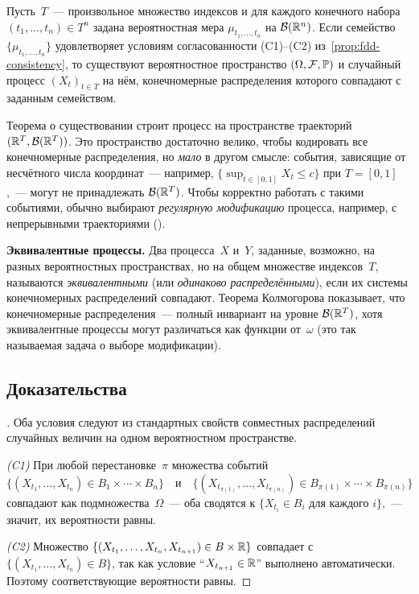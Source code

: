 \begin{theorem}
\label{thm:kolmogorov-extension}
Пусть~$T$~--- произвольное множество индексов и для каждого конечного набора $(t_1, \dots, t_n) \in T^n$ задана вероятностная мера $\mu_{t_1, \dots, t_n}$ на $\mathcal{B}(\mathbb{R}^n)$. Если семейство $\{\mu_{t_1, \dots, t_n}\}$ удовлетворяет условиям согласованности (C1)--(C2) из~\cref{prop:fdd-consistency}, то существуют вероятностное пространство $(\Omega, \mathcal{F}, \mathbb{P})$ и случайный процесс $(X_t)_{t \in T}$ на нём, конечномерные распределения которого совпадают с заданным семейством.
\end{theorem}

\begin{remark}
Теорема о существовании строит процесс на пространстве траекторий $(\mathbb{R}^T, \mathcal{B}(\mathbb{R}^T))$. Это пространство достаточно велико, чтобы кодировать все конечномерные распределения, но \emph{мало} в другом смысле: события, зависящие от несчётного числа координат~--- например, $\{\sup_{t \in [0, 1]} X_t \leq c\}$ при $T = [0, 1]$,~--- могут не принадлежать $\mathcal{B}(\mathbb{R}^T)$. Чтобы корректно работать с такими событиями, обычно выбирают \emph{регулярную модификацию} процесса, например, с непрерывными траекториями (\cite[гл.~II,~\S~2]{Sevastyanov1982}).
\end{remark}

\medskip
\noindent\textbf{Эквивалентные процессы.} Два процесса~$X$ и~$Y$, заданные, возможно, на разных вероятностных пространствах, но на общем множестве индексов~$T$, называются \emph{эквивалентными} (или \emph{одинаково распределёнными}), если их системы конечномерных распределений совпадают. Теорема Колмогорова показывает, что конечномерные распределения~--- полный инвариант на уровне $\mathcal{B}(\mathbb{R}^T)$, хотя эквивалентные процессы могут различаться как функции от~$\omega$ (это так называемая задача о выборе модификации).

\subsection*{Доказательства}

\begin{proof}[]
Оба условия следуют из стандартных свойств совместных распределений случайных величин на одном вероятностном пространстве.

\emph{(C1)} При любой перестановке~$\pi$ множества событий
\[
  \{(X_{t_1}, \dots, X_{t_n}) \in B_1 \times \cdots \times B_n\}
  \quad \text{и} \quad
  \{(X_{t_{\pi(1)}}, \dots, X_{t_{\pi(n)}}) \in B_{\pi(1)} \times \cdots \times B_{\pi(n)}\}
\]
совпадают как подмножества~$\Omega$~--- оба сводятся к $\{X_{t_i} \in B_i \text{ для каждого } i\}$,~--- значит, их вероятности равны.

\emph{(C2)} Множество $\{(X_{t_1}, \dots, X_{t_n}, X_{t_{n+1}}) \in B \times \mathbb{R}\}$ совпадает с $\{(X_{t_1}, \dots, X_{t_n}) \in B\}$, так как условие ``$X_{t_{n+1}} \in \mathbb{R}$'' выполнено автоматически. Поэтому соответствующие вероятности равны.
\end{proof}

